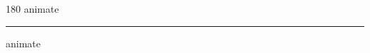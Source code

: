 
\begin{frame}
\begin{center}
\begin{turn}{180}
{\fontsize{2.5cm}{1em}\selectfont animate}
\end{turn}
\vspace{1em}\par  
\hrule
\vspace{1em}\par  
{\fontsize{2.5cm}{1em}\selectfont animate}
\end{center}
\end{frame}
